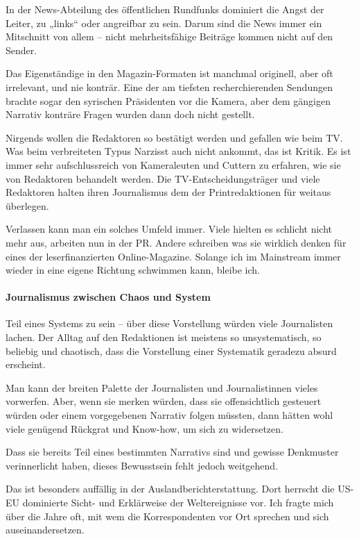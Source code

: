 In der News-Abteilung des öffentlichen Rundfunks dominiert die Angst der
Leiter, zu „links`` oder angreifbar zu sein. Darum sind die News immer
ein Mitschnitt von allem -- nicht mehrheitsfähige Beiträge kommen nicht
auf den Sender.

Das Eigenständige in den Magazin-Formaten ist manchmal originell, aber
oft irrelevant, und nie konträr. Eine der am tiefsten recherchierenden
Sendungen brachte sogar den syrischen Präsidenten vor die Kamera, aber
dem gängigen Narrativ konträre Fragen wurden dann doch nicht gestellt.

Nirgends wollen die Redaktoren so bestätigt werden und gefallen wie beim
TV. Was beim verbreiteten Typus Narzisst auch nicht ankommt, das ist
Kritik. Es ist immer sehr aufschlussreich von Kameraleuten und Cuttern
zu erfahren, wie sie von Redaktoren behandelt werden. Die
TV-Entscheidungs­träger und viele Redaktoren halten ihren Journalismus
dem der Printredaktionen für weitaus überlegen.

Verlassen kann man ein solches Umfeld immer. Viele hielten es schlicht
nicht mehr aus, arbeiten nun in der PR. Andere schreiben was sie
wirklich denken für eines der leserfinanzierten Online-Magazine. Solange
ich im Mainstream immer wieder in eine eigene Richtung schwimmen kann,
bleibe ich.

\hypertarget{journalismus-zwischen-chaos-und-system}{%
\paragraph{Journalismus zwischen Chaos und
System}\label{journalismus-zwischen-chaos-und-system}}

Teil eines Systems zu sein -- über diese Vorstellung würden viele
Journalisten lachen. Der Alltag auf den Redaktionen ist meistens so
unsystematisch, so beliebig und chaotisch, dass die Vorstellung einer
Systematik geradezu absurd erscheint.

Man kann der breiten Palette der Journalisten und Journalistinnen vieles
vorwerfen. Aber, wenn sie merken würden, dass sie offensichtlich
gesteuert würden oder einem vorgegebenen Narrativ folgen müssten, dann
hätten wohl viele genügend Rückgrat und Know-how, um sich zu
widersetzen.

Dass sie bereits Teil eines bestimmten Narrativs sind und gewisse
Denkmuster verinnerlicht haben, dieses Bewusstsein fehlt jedoch
weitgehend.

Das ist besonders auffällig in der Auslandberichterstattung. Dort
herrscht die US-EU dominierte Sicht- und Erklärweise der Weltereignisse
vor. Ich fragte mich über die Jahre oft, mit wem die Korres­pon­denten
vor Ort sprechen und sich auseinandersetzen.


